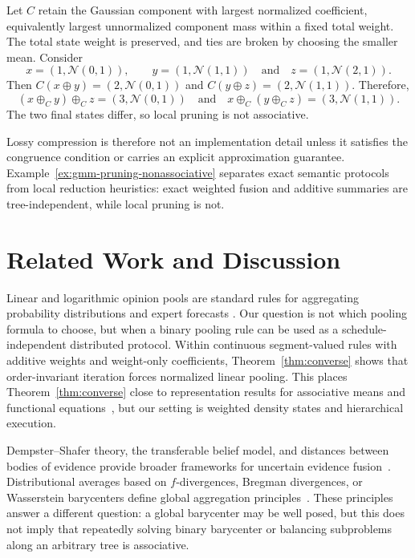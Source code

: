 \documentclass[runningheads]{llncs}
\newcommand{\N}{\mathcal{N}}
\begin{document}
\begin{example}\label{ex:gmm-pruning-nonassociative}
Let $C$ retain the Gaussian component with largest normalized
coefficient, equivalently largest unnormalized component mass within a fixed
total weight. The total state weight is preserved, and ties are broken by choosing
the smaller mean. Consider
\[x=(1,\N(0,1)),\qquad
  y=(1,\N(1,1))\quad\text{and}\quad
  z=(1,\N(2,1)).
\]
Then $C(x\oplus y)=(2,\N(0,1))$ and $ C(y\oplus z)=(2,\N(1,1))$.
Therefore,
\[ (x\oplus_C y)\oplus_C z=(3,\N(0,1))
  \quad\text{and}\quad
  x\oplus_C(y\oplus_C z)=(3,\N(1,1)).
\]
The two final states differ, so local pruning is not associative.
\end{example}

Lossy compression is therefore not an implementation detail unless it satisfies
the congruence condition or carries an explicit approximation guarantee.
Example~\ref{ex:gmm-pruning-nonassociative} separates exact semantic protocols
from local reduction heuristics: exact weighted fusion and additive summaries are
tree-independent, while local pruning is not.

\section{Related Work and Discussion}\label{sec:related} 
Linear and logarithmic opinion pools are standard rules for aggregating
probability distributions and expert forecasts
\cite{stone1961opinion,genest1986combining,jacobs1995methods}. Our question is
not which pooling formula to choose, but when a binary pooling rule can be used
as a schedule-independent distributed protocol. Within continuous
segment-valued rules with additive weights and weight-only coefficients,
Theorem~\ref{thm:converse} shows that order-invariant iteration forces
normalized linear pooling. This places Theorem~\ref{thm:converse} close to representation results for associative means and functional equations~\cite{aczel2006lectures}, but our setting is weighted density states and hierarchical execution.

Dempster--Shafer theory, the transferable belief model, and distances between bodies of evidence provide broader frameworks for uncertain evidence fusion~\cite{dempster2008upper,shafer1976mathematical,smets1994transferable,jousselme2001new}. Distributional averages based on $f$-divergences, Bregman divergences, or Wasserstein barycenters define global aggregation principles~\cite{ali1966general,csiszar1967information,banerjee2005clustering,nielsen2009sided,agueh2011barycenters}. These principles answer a different question: a global barycenter may be well posed, but this does not imply that repeatedly solving binary barycenter or balancing subproblems along an arbitrary tree is associative.
\end{document}
